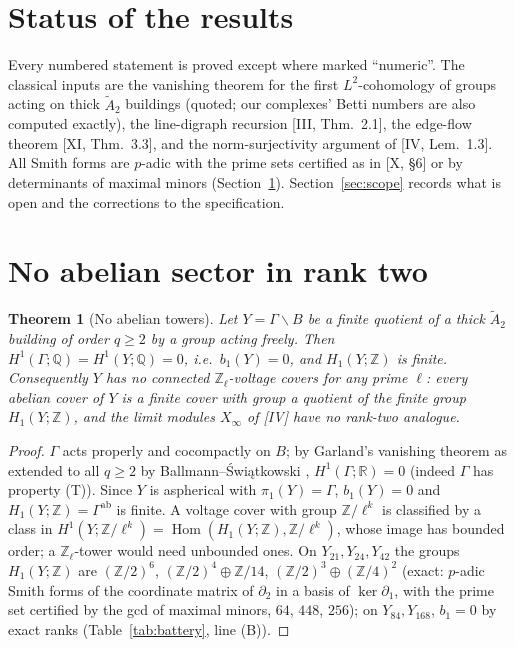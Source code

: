 \documentclass[11pt]{amsart}
\numberwithin{equation}{section}
\newtheorem{theorem}{Theorem}[section]
\theoremstyle{definition}
\theoremstyle{remark}
\newcommand{\Z}{\mathbb{Z}}
\newcommand{\Q}{\mathbb{Q}}
\newcommand{\Atwo}{\widetilde A_2}
\newcommand{\R}{\mathbb{R}}
\newcommand{\Hom}{\operatorname{Hom}}
\begin{document}
\maketitle

\section*{Status of the results}

Every numbered statement is proved except where marked ``numeric''. The classical inputs
are the vanishing theorem for the first $L^{2}$-cohomology of groups acting on thick
$\Atwo$ buildings \cite{Ga,BSw} (quoted; our complexes' Betti numbers are also computed
exactly), the line-digraph recursion [III, Thm.~2.1], the edge-flow theorem [XI, Thm.~3.3],
and the norm-surjectivity argument of [IV, Lem.~1.3]. All Smith forms are $p$-adic with the
prime sets certified as in [X, \S6] or by determinants of maximal minors
(Section~\ref{sec:noabelian}). Section~\ref{sec:scope} records what is open and the
corrections to the specification.

\section{No abelian sector in rank two}\label{sec:noabelian}

\begin{theorem}[No abelian towers]\label{thm:noabelian}
Let $Y=\Gamma\backslash B$ be a finite quotient of a thick $\Atwo$ building of order
$q\ge2$ by a group acting freely. Then $H^{1}(\Gamma;\Q)=H^{1}(Y;\Q)=0$, i.e.\ $b_1(Y)=0$,
and $H_1(Y;\Z)$ is finite. Consequently $Y$ has no connected $\Z_\ell$-voltage covers for
any prime $\ell$: every abelian cover of $Y$ is a finite cover with group a quotient of the
finite group $H_1(Y;\Z)$, and the limit modules $X_\infty$ of {\rm[IV]} have no rank-two
analogue.
\end{theorem}

\begin{proof}
$\Gamma$ acts properly and cocompactly on $B$; by Garland's vanishing theorem as extended
to all $q\ge2$ by Ballmann--\'Swi\k{a}tkowski \cite{Ga,BSw}, $H^{1}(\Gamma;\R)=0$ (indeed
$\Gamma$ has property (T)). Since $Y$ is aspherical with $\pi_1(Y)=\Gamma$, $b_1(Y)=0$ and
$H_1(Y;\Z)=\Gamma^{\mathrm{ab}}$ is finite. A voltage cover with group $\Z/\ell^{k}$ is
classified by a class in $H^{1}(Y;\Z/\ell^{k})=\Hom(H_1(Y;\Z),\Z/\ell^{k})$, whose image
has bounded order; a $\Z_\ell$-tower would need unbounded ones. On $Y_{21},Y_{24},Y_{42}$
the groups $H_1(Y;\Z)$ are $(\Z/2)^{6}$, $(\Z/2)^{4}\oplus\Z/14$, $(\Z/2)^{3}\oplus(\Z/4)^{2}$
(exact: $p$-adic Smith forms of the coordinate matrix of $\partial_2$ in a basis of
$\ker\partial_1$, with the prime set certified by the gcd of maximal minors, $64$, $448$,
$256$); on $Y_{84},Y_{168}$, $b_1=0$ by exact ranks (Table~\ref{tab:battery}, line (B)).
\end{proof}
\end{document}
